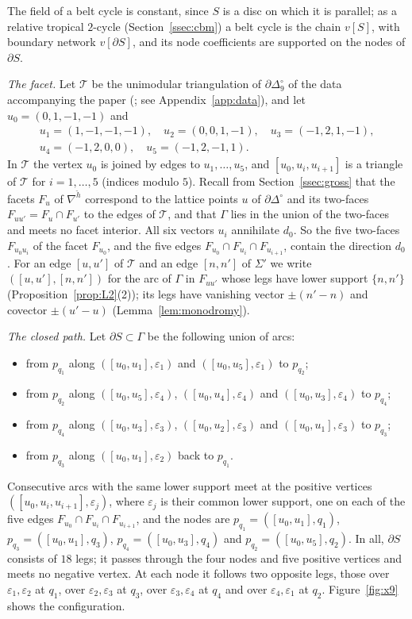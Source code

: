 The field of a belt cycle is constant, since $S$ is a disc on which it is parallel; as a relative tropical
$2$-cycle (Section~\ref{ssec:cbm}) a belt cycle is the chain $v[S]$, with boundary network $v[\partial S]$, and its node
coefficients are supported on the nodes of $\partial S$.

\emph{The facet.} Let $\mathcal T$ be the unimodular triangulation of $\partial\Delta_9^\circ$ of the data accompanying the paper
(\coderepo; see Appendix~\ref{app:data}), and let $u_0=(0,1,-1,-1)$ and
\[
\begin{gathered}
u_1=(1,-1,-1,-1),\quad u_2=(0,0,1,-1),\quad u_3=(-1,2,1,-1),\\ u_4=(-1,2,0,0),\quad u_5=(-1,2,-1,1).
\end{gathered}
\]
In $\mathcal T$ the vertex $u_0$ is joined by edges to $u_1,\dots,u_5$, and $[u_0,u_i,u_{i+1}]$ is a triangle of $\mathcal T$
for $i=1,\dots,5$ (indices modulo $5$). Recall from Section~\ref{ssec:gross} that the facets $F_u$ of
$\nabla^{\check h}$ correspond to the lattice points $u$ of $\partial\Delta^\circ$ and its two-faces $F_{uu'}=F_u\cap F_{u'}$
to the edges of $\mathcal T$, and that $\Gamma$ lies in the union of the two-faces and meets no facet interior. All six
vectors $u_i$ annihilate $d_0$. So the five two-faces $F_{u_0u_i}$ of the facet $F_{u_0}$, and the five edges
$F_{u_0}\cap F_{u_i}\cap F_{u_{i+1}}$, contain the direction $d_0$. For an edge $[u,u']$ of $\mathcal T$ and an edge
$[n,n']$ of $\Sigma'$ we write $([u,u'],[n,n'])$ for the arc of $\Gamma$ in $F_{uu'}$ whose legs have lower support
$\{n,n'\}$ (Proposition~\ref{prop:L2}(2)); its legs have vanishing vector $\pm(n'-n)$ and covector $\pm(u'-u)$
(Lemma~\ref{lem:monodromy}).

\emph{The closed path.} Let $\partial S\subset\Gamma$ be the following union of arcs:
\begin{itemize}
\item from $p_{q_1}$ along $([u_0,u_1],\varepsilon_1)$ and $([u_0,u_5],\varepsilon_1)$ to $p_{q_2}$;
\item from $p_{q_2}$ along $([u_0,u_5],\varepsilon_4)$, $([u_0,u_4],\varepsilon_4)$ and $([u_0,u_3],\varepsilon_4)$ to $p_{q_4}$;
\item from $p_{q_4}$ along $([u_0,u_3],\varepsilon_3)$, $([u_0,u_2],\varepsilon_3)$ and $([u_0,u_1],\varepsilon_3)$ to $p_{q_3}$;
\item from $p_{q_3}$ along $([u_0,u_1],\varepsilon_2)$ back to $p_{q_1}$.
\end{itemize}
Consecutive arcs with the same lower support meet at the positive vertices $([u_0,u_i,u_{i+1}],\varepsilon_j)$, where $\varepsilon_j$ is their common lower support, one on each of
the five edges $F_{u_0}\cap F_{u_i}\cap F_{u_{i+1}}$, and the nodes are $p_{q_1}=([u_0,u_1],q_1)$,
$p_{q_3}=([u_0,u_1],q_3)$, $p_{q_4}=([u_0,u_3],q_4)$ and $p_{q_2}=([u_0,u_5],q_2)$. In all, $\partial S$ consists of $18$
legs; it passes through the four nodes and five positive vertices and meets no negative vertex. At each node it follows
two opposite legs, those over $\varepsilon_1,\varepsilon_2$ at $q_1$, over $\varepsilon_2,\varepsilon_3$ at $q_3$, over $\varepsilon_3,\varepsilon_4$ at $q_4$
and over $\varepsilon_4,\varepsilon_1$ at $q_2$. Figure~\ref{fig:x9} shows the configuration.

